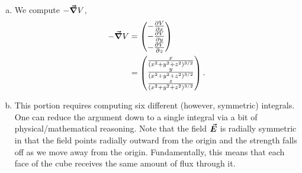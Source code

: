 \documentclass[12pt]{article} %
\begin{document}
\begin{solution}
    \begin{enumerate}[(a)]
        \item   We compute $-\boldsymbol{\vec{\nabla}} V$,
        \begin{align*}
            -\boldsymbol{\vec{\nabla}} V &= \begin{pmatrix} -\frac{\partial V}{\partial x} \\ -\frac{\partial V}{\partial y} \\ -\frac{\partial V}{\partial z} \end{pmatrix}\\
            &= \begin{pmatrix} \frac{x}{(x^2+y^2+z^2)^{3/2}} \\ \frac{y}{(x^2+y^2+z^2)^{3/2}} \\ \frac{z}{(x^2+y^2+z^2)^{3/2}} \end{pmatrix}.
        \end{align*}
        \item This portion requires computing six different (however, symmetric) integrals.  One can reduce the argument down to a single integral via a bit of physical/mathematical reasoning. Note that the field $\boldsymbol{\vec{E}}$ is radially symmetric in that the field points radially outward from the origin and the strength falls off as we move away from the origin.  Fundamentally, this means that each face of the cube receives the same amount of flux through it.
        

\end{enumerate}
\end{solution}
\end{document}
